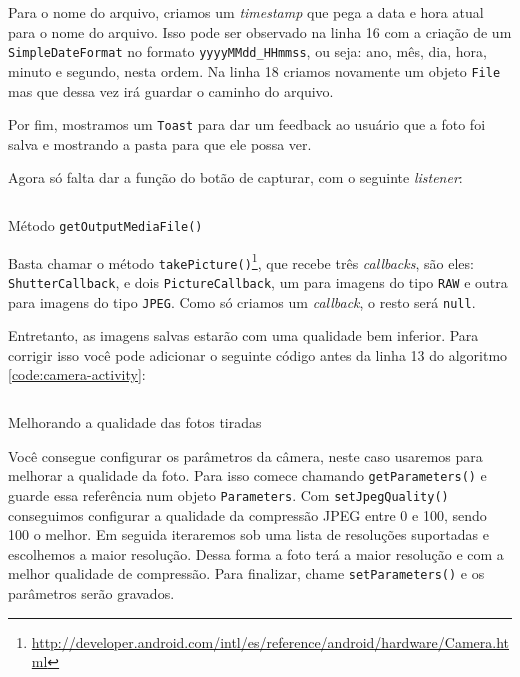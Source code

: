 \documentclass[a4paper,12pt,brazil]{book}
\begin{document}
\begin{singlespace}
		Para o nome do arquivo, criamos um \emph{timestamp} que pega a data e hora atual para o nome do arquivo. Isso pode ser observado na linha 16 com a criação de um \texttt{SimpleDateFormat} no formato \texttt{yyyyMMdd\_HHmmss}, ou seja: ano, mês, dia, hora, minuto e segundo, nesta ordem. Na linha 18 criamos novamente um objeto \texttt{File} mas que dessa vez irá guardar o caminho do arquivo. 

		Por fim, mostramos um \texttt{Toast} para dar um feedback ao usuário que a foto foi salva e mostrando a pasta para que ele possa ver. 

		Agora só falta dar a função do botão de capturar, com o seguinte \emph{listener}:

		\begin{listing}[H]
		\inputminted[linenos=true,fontsize=\small,frame=lines, framesep=2mm, tabsize=2,numbersep=5pt]{java}{src/api/camera/takepic.java}
		\caption{Método \texttt{getOutputMediaFile()}}
		\label{code:camera-takepic}
		\end{listing} 			

		Basta chamar o método \texttt{takePicture()}\footnote{\href{http://developer.android.com/intl/es/reference/android/hardware/Camera.html}{http://developer.android.com/intl/es/reference/android/hardware/Camera.html}}, que recebe três \emph{callbacks}, são eles: \texttt{ShutterCallback}, e dois \texttt{PictureCallback}, um para imagens do tipo \texttt{RAW} e outra para imagens do tipo \texttt{JPEG}. Como só criamos um \emph{callback}, o resto será \texttt{null}.
		
		Entretanto, as imagens salvas estarão com uma qualidade bem inferior. Para corrigir isso você pode adicionar o seguinte código antes da linha 13 do algoritmo \ref{code:camera-activity}:
	
		\begin{listing}[H]
		\inputminted[linenos=true,fontsize=\small,frame=lines, framesep=2mm, tabsize=2,numbersep=5pt]{java}{src/api/camera/params.java}
		\caption{Melhorando a qualidade das fotos tiradas}
		\label{code:better-quali}
		\end{listing} 			

		Você consegue configurar os parâmetros da câmera, neste caso usaremos para melhorar a qualidade da foto. Para isso comece chamando \texttt{getParameters()} e guarde essa referência num objeto \texttt{Parameters}. Com \texttt{setJpegQuality()} conseguimos configurar a qualidade da compressão JPEG entre 0 e 100, sendo 100 o melhor. Em seguida iteraremos sob uma lista de resoluções suportadas e escolhemos a maior resolução. Dessa forma a foto terá a maior resolução e com a melhor qualidade de compressão.
		Para finalizar, chame \texttt{setParameters()} e os parâmetros serão gravados.


\end{singlespace}
\end{document}
